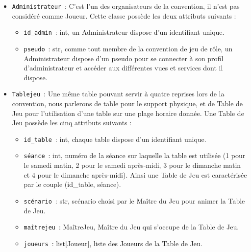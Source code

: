\documentclass[11pt]{article}
\begin{document}
\bigbreak

\begin{itemize}
    \item \texttt{Administrateur}~: C'est l'un des organisateurs de la convention, il n’est pas considéré comme Joueur. Cette classe possède les deux attributs suivants :
    \begin{itemize}[label=, font=\small]
        \item \texttt{id\_admin}~: int, un Administrateur dispose d'un identifiant unique.
        \item \texttt{pseudo}~: str, comme tout membre de la convention de jeu de rôle, un Administrateur dispose d'un pseudo pour se connecter à son profil d'administrateur et accéder aux différentes vues et services dont il dispose.
    \end{itemize}

    \item \texttt{Tablejeu}~: Une même table pouvant servir à quatre reprises lors de la convention, nous parlerons de table pour le support physique, et de Table de Jeu pour l'utilisation d'une table sur une plage horaire donnée. Une Table de Jeu possède les cinq attributs suivants :
    \begin{itemize}[label=, font=\small]
        \item \texttt{id\_table}~: int, chaque table dispose d'un  identifiant unique.
        \item \texttt{séance}~: int, numéro de la séance sur laquelle la table est utilisée (1 pour le samedi matin, 2 pour le samedi après-midi, 3 pour le dimanche matin et 4 pour le dimanche après-midi). Ainsi une Table de Jeu est caractérisée par le couple (id\_table, séance).
        \item \texttt{scénario}~: str, scénario choisi par le Maître du Jeu pour animer la Table de Jeu.
        \item \texttt{maîtrejeu}~: MaîtreJeu, Maître du Jeu qui s'occupe de la Table de Jeu.
        \item \texttt{joueurs}~: list[Joueur], liste des Joueurs de la Table de Jeu. 
    \end{itemize}
    

\end{itemize}
\end{document}
